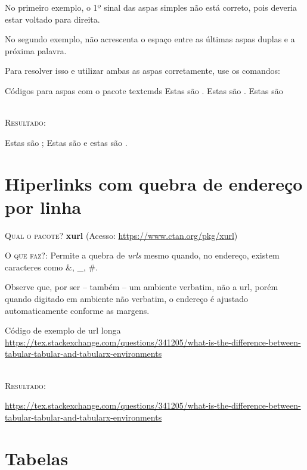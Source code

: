 \documentclass[a4paper,12pt,oneside,openright,extrafontsizes,openbib]{memoir}
\begin{document}
{No primeiro exemplo, o 1º sinal das aspas simples não está correto, pois deveria estar voltado para direita.

No segundo exemplo, não acrescenta o espaço entre as últimas aspas duplas e a próxima palavra.

Para resolver isso e utilizar ambas as aspas corretamente, use os comandos:
\ \\

\begin{codex}{Códigos para aspas com o pacote textcmds}
Estas são .
Estas são .
Estas são 
\end{codex}
\ \\

\textsc{Resultado}:

Estas são ; Estas são  e estas são .


\chapter{Hiperlinks com quebra de endereço por linha}

\textsc{Qual o pacote?} \textbf{xurl} (Acesso: \url{https://www.ctan.org/pkg/xurl})

\textsc{O que faz?}: Permite a quebra de \textit{urls} mesmo quando, no endereço, existem caracteres como \&, \_, \#.

Observe que, por ser -- também -- um ambiente verbatim, não  a url, porém quando digitado em ambiente não verbatim, o endereço é ajustado automaticamente conforme as margens.
\ \\

\begin{codex}{Código de exemplo de url longa}
\url{https://tex.stackexchange.com/questions/341205/what-is-the-difference-between-tabular-tabular-and-tabularx-environments}
\end{codex}
\ \\

\textsc{Resultado:}

\url{https://tex.stackexchange.com/questions/341205/what-is-the-difference-between-tabular-tabular-and-tabularx-environments}

\chapter{Tabelas}

}
\end{document}
